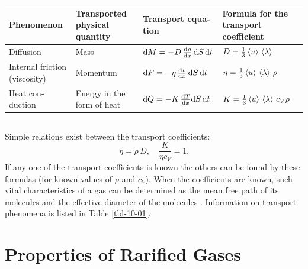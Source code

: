 \begin{table}
\begin{footnotesize}
\begin{tabular}{p{2cm}p{2cm}p{3cm}p{2.75cm}}
\toprule
Phenomenon & Transported physical quantity & Transport equa­tion & Formula for the transport coefficient \\
\midrule
Diffusion & Mass & $\dd M = - D \,\dv{\rho}{x}\, \dd S \,\dd t$ & $D = \frac{1}{3} \expval{u}\, \expval{\lambda}$ \\[5pt]
Internal friction (viscosity) & Momentum &$\dd F = - \eta \,\dv{v}{x}\, \dd S \,\dd t$ & $\eta = \frac{1}{3} \expval{u}\, \expval{\lambda} \, \rho$\\
Heat con­duction & Energy in the form of heat & $\dd Q  = - K \,\dv{T}{x} \dd S \,\dd t$ & $K = \frac{1}{3} \expval{u}\, \expval{\lambda} \, c_{V} \rho$\\
\bottomrule
\end{tabular}
\end{footnotesize}
\end{table}
\subsection{}\label{10.8.7} Simple relations exist between the transport coefficients:
\begin{equation*}%
\eta = \rho \, D, \quad \frac{K}{\eta c_{V}} = 1.
\end{equation*}
If any one of the transport coefficients is known the others can be found by these formulas (for known values of $\rho$ and $c_{V}$). When the coefficients are known, such vital characteristics of a gas can be determined as the mean free path  of its molecules and the effective diameter of the molecules . Information on transport phenomena is listed in Table \ref{tbl-10-01}.

\section{Properties of Rarified Gases}
\label{10.9}

